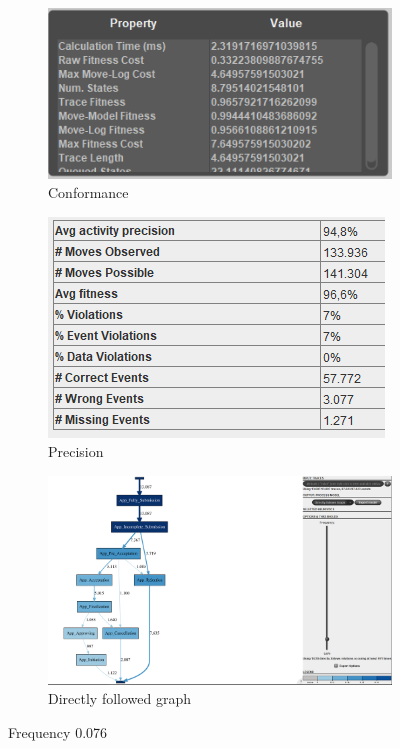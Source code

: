 \begin{figure}[h]
\centering
\begin{subfigure}{.49\textwidth}
  \centering
  \includegraphics[width=\linewidth]{App_Conformance0-076.PNG}
  \caption{Conformance}
  \label{fig:APP_Conf0-076}
\end{subfigure}
\begin{subfigure}{.49\textwidth}
  \centering
  \includegraphics[width=\linewidth]{App_Precision0-076.PNG}
  \caption{Precision}
  \label{fig:APP_Prec0-076}
\end{subfigure}
\begin{subfigure}{\textwidth}
  \centering
  \includegraphics[width=\linewidth]{App_DirectlyFollowedFreq0-076.PNG}
  \caption{Directly followed graph}
  \label{fig:APP_DF0-076}
\end{subfigure}%
\caption{Frequency 0.076}
\label{fig:App_Prec}
\end{figure}


